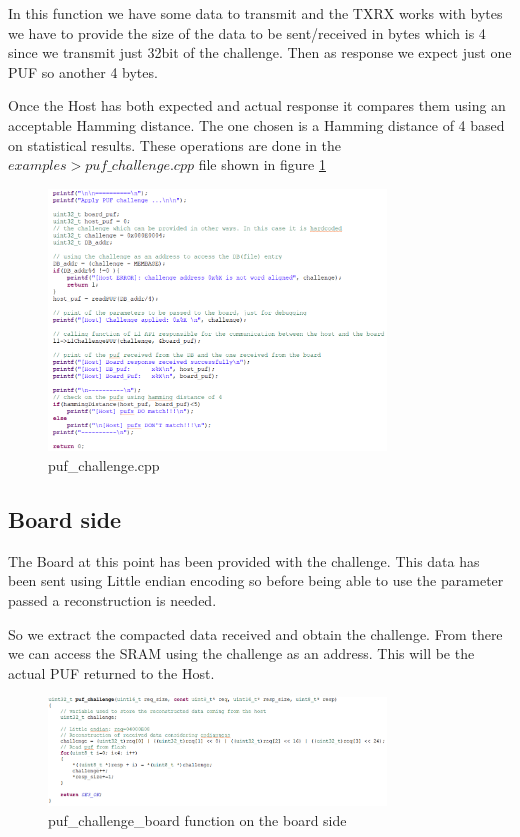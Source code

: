 In this function we have some data to transmit and the TXRX works with bytes we have to provide the size of the data to be sent/received in bytes which is 4 since we transmit just 32bit of the challenge. Then as response we expect just one PUF so another 4 bytes.

Once the Host has both expected and actual response it compares them using an acceptable Hamming distance. The one chosen is a Hamming distance of 4 based on statistical results. These operations are done in the $examples > puf\_challenge.cpp$ file shown in figure \ref{fig:puf_challenge.cpp}

\begin{figure}[h!]
	\vspace{0.5cm}
	\includegraphics[width = 0.8\textwidth]{images/puf_challenge.png}
	\caption{puf\_challenge.cpp}
	\label{fig:puf_challenge.cpp}
\end{figure}

\subsection{Board side}

The Board at this point has been provided with the challenge. This data has been sent using Little endian encoding so before being able to use the parameter passed a reconstruction is needed.

So we extract the compacted data received and obtain the challenge. From there we can access the SRAM using the challenge as an address. This will be the actual PUF returned to the Host.

\begin{figure}[h!]
	\vspace{0.5cm}
	\includegraphics[width = 0.8\textwidth]{images/puf_challenge_board.png}
	\caption{puf\_challenge\_board function on the board side}
	\label{fig:puf_challenge_board}
\end{figure}
